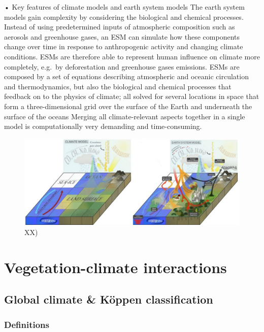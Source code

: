 \documentclass[12pt,oneside]{book}
\begin{document}
• Key features of climate models and earth system models The earth
system models gain complexity by considering the biological and chemical
processes. Instead of using predetermined inputs of atmospheric
composition such as aerosols and greenhouse gases, an ESM can simulate
how these components change over time in response to anthropogenic
activity and changing climate conditions. ESMs are therefore able to
represent human influence on climate more completely, e.g.~by
deforestation and greenhouse gases emissions. ESMs are composed by a set
of equations describing atmospheric and oceanic circulation and
thermodynamics, but also the biological and chemical processes that
feedback on to the physics of climate; all solved for several locations
in space that form a three-dimensional grid over the surface of the
Earth and underneath the surface of the oceans Merging all
climate-relevant aspects together in a single model is computationally
very demanding and time-consuming.

\begin{figure}

{\centering \includegraphics[width=0.8\linewidth]{figures/Figure714} 

}

\caption{XX)}\label{fig:Earthsystemmodels3}
\end{figure}

\part{Vegetation-climate
interactions}\label{part-vegetation-climate-interactions}

\chapter{Global climate \& Köppen classification}\label{introKopen}


\section{Definitions}\label{definitions-1}
\end{document}
